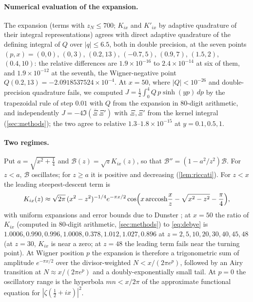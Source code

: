 \documentclass[11pt]{article}
\theoremstyle{definition}\newtheorem{definition}[theorem]{Definition}
\theoremstyle{remark}\newtheorem{remark}[theorem]{Remark}
\begin{document}
\paragraph{Numerical evaluation of the expansion.} The expansion (terms with $z_N\le700$; $K_{ix}$ and $K'_{ix}$ by adaptive quadrature of their integral representations) agrees with direct adaptive quadrature of the defining integral of $Q$ over $|q|\le6.5$, both in double precision, at the seven points $(p,x)=(0,0)$, $(0,3)$, $(0.2,13)$, $(-0.7,5)$, $(0.9,7)$, $(1.5,2)$, $(0.4,10)$: the relative differences are $1.9\times10^{-16}$ to $2.4\times10^{-14}$ at six of them, and $1.9\times10^{-12}$ at the seventh, the Wigner-negative point $Q(0.2,13)=-2.0918537524\times10^{-4}$. At $x=50$, where $|Q|<10^{-26}$ and double-precision quadrature fails, we computed $J=\frac12\int_0^4Q\,p\sinh(yp)\,dp$ by the trapezoidal rule of step $0.01$ with $Q$ from the expansion in 80-digit arithmetic, and independently $J=-4\Im(\bar\Xi\,\Xi')$ with $\Xi,\Xi'$ from the kernel integral (\cref{sec:methods}); the two agree to relative $1.3$--$1.8\times10^{-15}$ at $y=0.1,0.5,1$.

\paragraph{Two regimes.} Put $a=\sqrt{x^2+\frac14}$ and $\mathcal B(z)=\sqrt zK_{ix}(z)$, so that $\mathcal B''=(1-a^2/z^2)\mathcal B$. For $z<a$, $\mathcal B$ oscillates; for $z\ge a$ it is positive and decreasing (\cref{lem:riccati}). For $z<x$ the leading steepest-descent term is
\begin{equation}\label{eq:debye}
K_{ix}(z)\approx\sqrt{2\pi}\,(x^2-z^2)^{-1/4}e^{-\pi x/2}\cos\Bigl(x\,\mathrm{arccosh}\frac xz-\sqrt{x^2-z^2}-\frac\pi4\Bigr),
\end{equation}
with uniform expansions and error bounds due to Dunster \cite{Dunster}; at $x=50$ the ratio of $K_{ix}$ (computed in 80-digit arithmetic, \cref{sec:methods}) to \eqref{eq:debye} is $1.0006,0.990,0.996,1.0008,0.378,1.012,1.027,0.896$ at $z=2,5,10,20,30,40,45,48$ (at $z=30$, $K_{ix}$ is near a zero; at $z=48$ the leading term fails near the turning point). At Wigner position $p$ the expansion is therefore a trigonometric sum of amplitude $e^{-\pi x/2}$ over the divisor-weighted $N<x/(2\pi e^p)$, followed by an Airy transition at $N\approx x/(2\pi e^p)$ and a doubly-exponentially small tail. At $p=0$ the oscillatory range is the hyperbola $mn<x/2\pi$ of the approximate functional equation for $|\zeta(\frac12+ix)|^2$.
\end{document}
